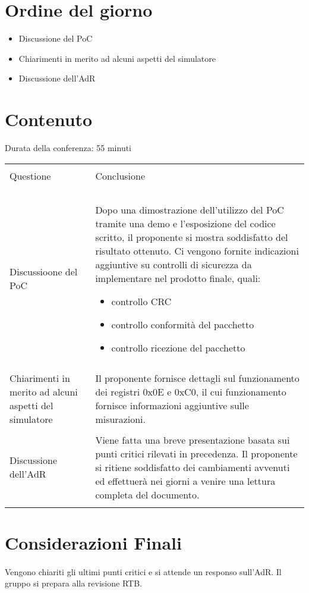 \section{Ordine del giorno}
\begin{itemize}
    \item Discussione del PoC
    \item Chiarimenti in merito ad alcuni aspetti del simulatore
    \item Discussione dell'AdR
\end{itemize}
\section{Contenuto}
Durata della conferenza: 55 minuti
\newline
\begin{longtable}{|p{7cm}|p{8cm}|}
    \hline
    & \\
    Questione & Conclusione\\
    & \\
    \hline
    & \\

    Discussioone del PoC    
    &
    Dopo una dimostrazione dell'utilizzo del PoC tramite una demo e l'esposizione del codice scritto, il proponente si mostra soddisfatto
    del risultato ottenuto. Ci vengono fornite indicazioni aggiuntive su controlli di sicurezza da implementare nel prodotto finale, quali:
    \begin{itemize}
        \item controllo CRC
        \item controllo conformità del pacchetto
        \item controllo ricezione del pacchetto
    \end{itemize}
    \\
    & \\

    Chiarimenti in merito ad alcuni aspetti del simulatore
    &
    Il proponente fornisce dettagli sul funzionamento dei registri 0x0E e 0xC0, il cui funzionamento fornisce informazioni aggiuntive sulle 
    misurazioni.\\
    
    & \\

    Discussione dell'AdR
    &
    Viene fatta una breve presentazione basata sui punti critici rilevati in precedenza. Il proponente si ritiene soddisfatto dei cambiamenti
    avvenuti ed effettuerà nei giorni a venire una lettura completa del documento.\\

    & \\
    \hline
    
\end{longtable}

\section{Considerazioni Finali}

\paragraph{}
Vengono chiariti gli ultimi punti critici e si attende un responso sull'AdR. Il gruppo si prepara alla revisione RTB.